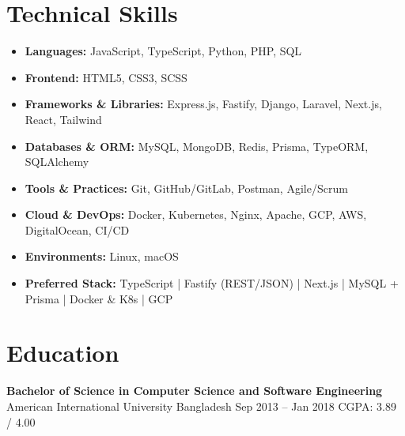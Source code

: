 \documentclass[a4paper,10pt]{article}
\begin{document}
\section*{Technical Skills}
\begin{itemize}[leftmargin=12pt]
  \item \textbf{Languages:} JavaScript, TypeScript, Python, PHP, SQL
  \item \textbf{Frontend:} HTML5, CSS3, SCSS
  \item \textbf{Frameworks \& Libraries:} Express.js, Fastify, Django, Laravel, Next.js, React, Tailwind
  \item \textbf{Databases \& ORM:} MySQL, MongoDB, Redis, Prisma, TypeORM, SQLAlchemy
  \item \textbf{Tools \& Practices:} Git, GitHub/GitLab, Postman, Agile/Scrum
  \item \textbf{Cloud \& DevOps:} Docker, Kubernetes, Nginx, Apache, GCP, AWS, DigitalOcean, CI/CD
  \item \textbf{Environments:} Linux, macOS
  \item \textbf{Preferred Stack:} TypeScript | Fastify (REST/JSON) | Next.js | MySQL + Prisma | Docker \& K8s | GCP
\end{itemize}

\section*{Education}
\textbf{Bachelor of Science in Computer Science and Software Engineering}\\
American International University Bangladesh \hfill Sep 2013 -- Jan 2018 \hspace{1em} CGPA: 3.89 / 4.00
\end{document}
